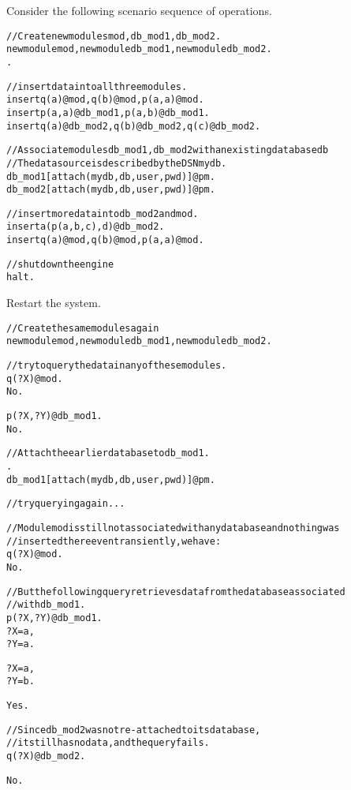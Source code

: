 Consider the following scenario sequence of operations.

\begin{alltt}
// Create new modules mod, db_mod1, db_mod2.
\prompt newmodule{mod}, newmodule{db_mod1}, newmodule{db_mod2}.
\prompt [persistentmodules>>pm].

// insert data into all three modules.
\prompt insert{q(a)@mod,q(b)@mod,p(a,a)@mod}.
\prompt insert{p(a,a)@db_mod1, p(a,b)@db_mod1}.
\prompt insert{q(a)@db_mod2,q(b)@db_mod2,q(c)@db_mod2}.

//  Associate modules db_mod1, db_mod2 with an existing database db
//  The data source is described by the DSN mydb.
\prompt db_mod1[attach(mydb,db,user,pwd)]@pm.
\prompt db_mod2[attach(mydb,db,user,pwd)]@pm.

// insert more data into db_mod2 and mod.
\prompt insert{a(p(a,b,c),d)@db_mod2}.
\prompt insert{q(a)@mod,q(b)@mod,p(a,a)@mod}.

// shut down the engine
\prompt \bs{}halt.
\end{alltt}

\noindent
Restart the \FLSYSTEM system.

\begin{alltt}
// Create the same modules again
\prompt newmodule{mod}, newmodule{db_mod1}, newmodule{db_mod2}.

// try to query the data in any of these modules.
\prompt q(?X)@mod.
No.

\prompt p(?X,?Y)@db_mod1.
No.

//  Attach the earlier database to db_mod1.
\prompt [persistentmodules>>pm].
\prompt db_mod1[attach(mydb,db,user,pwd)]@pm.

// try querying again...

// Module mod is still not associated with any database and nothing was
// inserted there even transiently, we have:
\prompt q(?X)@mod.
No.

// But the following query retrieves data from the database associated
// with db_mod1.
\prompt p(?X,?Y)@db_mod1.
?X = a,
?Y = a.

?X = a,
?Y = b.

Yes.

// Since db_mod2 was not re-attached to its database,
// it still has no data, and the query fails.
\prompt q(?X)@db_mod2.

No.
\end{alltt}



